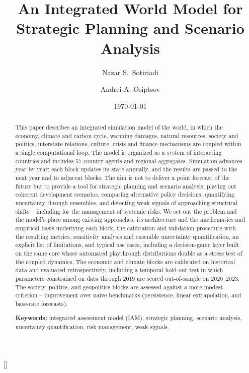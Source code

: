 \documentclass[a4paper,fleqn]{cas-sc}
\begin{document}
\let\WriteBookmarks\relax
\def\floatpagepagefraction{1}
\def\textpagefraction{.001}




\title[mode = title]{An Integrated World Model for Strategic Planning and Scenario Analysis}
\author[1]{Nazar S.~Sotiriadi}
\cormark[1]
\author[1,2]{Andrei A. Osiptsov}[]

\date{\today}

\maketitle

\begin{abstract}
\noindent
This paper describes an integrated simulation model of the world, in which the economy, climate
and carbon cycle, warming damages, natural resources, society and politics, interstate
relations, culture, crisis and finance mechanisms are coupled within a single computational
loop. The model is organized as a system of interacting countries and includes 57 country agents and regional aggregates. Simulation advances year by year: each block updates its state annually, and the results are passed to the next year and to adjacent blocks. The aim is not to deliver a point forecast of the future but to provide a tool for strategic planning and scenario analysis: playing out coherent development scenarios, comparing alternative policy decisions, quantifying uncertainty through ensembles, and detecting weak signals of approaching structural shifts -- including for the management of systemic risks. We set out the problem and the model's place among existing approaches, its architecture and the mathematics and empirical basis underlying each block, the calibration and validation procedure with the resulting metrics, sensitivity analysis and ensemble uncertainty quantification, an explicit list of limitations, and typical use cases, including a decision-game layer built on the same core whose automated playthrough distributions double as a stress test of the coupled dynamics. The economic and climate blocks are calibrated on historical data and evaluated retrospectively, including a temporal hold-out test in which parameters constrained on data through 2019 are scored out-of-sample on 2020--2023. The society, politics, and geopolitics blocks are assessed against a more modest criterion -- improvement over naive benchmarks (persistence, linear extrapolation, and base-rate forecasts).

\medskip
\noindent\textbf{Keywords:} integrated assessment model (IAM), strategic planning, scenario analysis, uncertainty quantification, risk management, weak signals.
\end{abstract}
\end{document}
